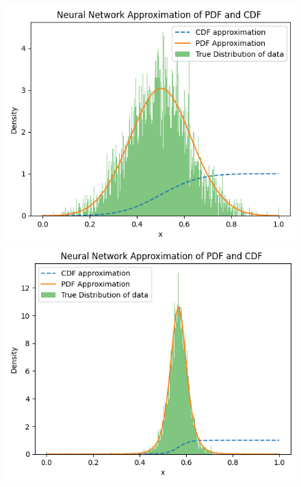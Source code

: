 \begin{figure}[h]
\centering

\begin{minipage}{0.45\textwidth}
\centering
\includegraphics[width=\textwidth]{5ResultsDiscussion/pictures/MarginalTest/NormalHistogram.png}
\end{minipage}
\hfill
\begin{minipage}{0.45\textwidth}
\centering
\includegraphics[width=\textwidth]{5ResultsDiscussion/pictures/MarginalTest/StudentsHistogram.png}
\end{minipage}


\end{figure}

